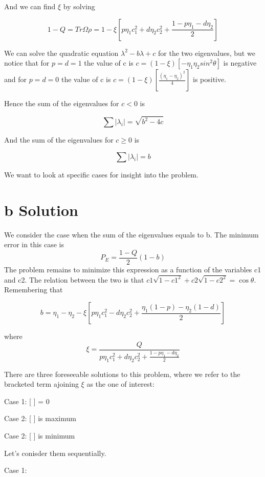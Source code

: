 \documentclass[12pt,oneside,english,reqno]{amsbook}
\numberwithin{section}{chapter}
\numberwithin{equation}{section}
\numberwithin{figure}{section}
\newcommand{\abs}[1]{\left|{#1}\right|}
\begin{document}
And we can find $\xi$ by solving


\[1-Q = Tr \Omega \rho = 1- \xi [ p\eta_1 c_1^2+ d\eta_2 c_2^2+ \frac{1-p\eta_1 -d\eta_2}{2}]\]


We can solve the quadratic equation $\lambda^2 -b \lambda +c$ for the two eigenvalues, but we notice that for $p=d=1$ the value of c is $c= (1-\xi)[-\eta_1\eta_2 sin^2 \theta]$ is negative and for $p=d=0$ the value of c is $c= (1-\xi)[\frac{(\eta_1-\eta_2)^2}{4}]$ is positive. 

 Hence the sum of the eigenvalues for $c<0$ is

\[\sum \abs {\lambda_i} = \sqrt{b^2-4c}\]

And the sum of the eigenvalues for $c \geq 0$ is

\[\sum \abs {\lambda_i} =b\]

We want to look at specific cases for insight into the problem. 



\section{b Solution}

We consider the case when the sum of the eigenvalues equals to b.  The minimum error in this case is 
\[P_E = \frac{1-Q}{2}(1-b)\]
The problem remains to minimize this expression as a function of the variables c1 and c2.  The relation between the two is that $c1 \sqrt{1-c1^2} + c2 \sqrt{1-c2^2} = \cos \theta$.  Remembering that

\[b = \eta_1 -\eta_2 - \xi [ p\eta_1 c_1^2 - d\eta_2 c_2^2 + \frac{\eta_1(1-p) - \eta_2(1-d)}{2}]\]

where
\[ \xi = \frac{Q}{ p\eta_1 c_1^2+ d\eta_2 c_2^2+ \frac{1-p\eta_1 -d\eta_2}{2}}\]

There are three foreseeable solutions to this problem, where we refer to the bracketed term ajoining $\xi$ as the one of interest:

Case 1: [ ] = 0

Case 2: [ ] is maximum

Case 2: [ ] is minimum

Let's conisder them sequentially.

\bigskip

Case 1:
\end{document}
